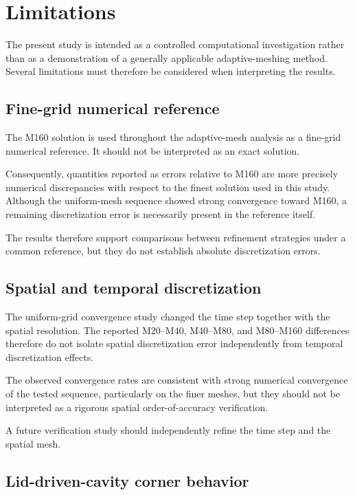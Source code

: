 \section{Limitations}
\label{sec:limitations}

The present study is intended as a controlled computational investigation
rather than as a demonstration of a generally applicable adaptive-meshing
method. Several limitations must therefore be considered when interpreting
the results.

\subsection{Fine-grid numerical reference}

The M160 solution is used throughout the adaptive-mesh analysis as a
fine-grid numerical reference. It should not be interpreted as an exact
solution.

Consequently, quantities reported as errors relative to M160 are more
precisely numerical discrepancies with respect to the finest solution used
in this study. Although the uniform-mesh sequence showed strong convergence
toward M160, a remaining discretization error is necessarily present in the
reference itself.

The results therefore support comparisons between refinement strategies
under a common reference, but they do not establish absolute discretization
errors.

\subsection{Spatial and temporal discretization}

The uniform-grid convergence study changed the time step together with the
spatial resolution. The reported M20--M40, M40--M80, and M80--M160
differences therefore do not isolate spatial discretization error
independently from temporal discretization effects.

The observed convergence rates are consistent with strong numerical
convergence of the tested sequence, particularly on the finer meshes, but
they should not be interpreted as a rigorous spatial order-of-accuracy
verification.

A future verification study should independently refine the time step and
the spatial mesh.

\subsection{Lid-driven-cavity corner behavior}

